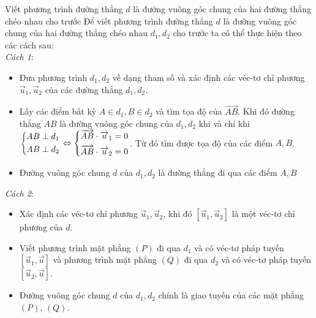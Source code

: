 \begin{dang}{Viết phương trình đường thẳng $d$ là đường vuông góc chung của hai đường thẳng chéo nhau cho trước}
Để viết phương trình đường thẳng $d$ là đường vuông góc chung của hai đường thẳng chéo nhau $d_1, d_2$ cho trước ta có thể thực hiện theo các cách sau:\\
\emph{Cách 1}:
\begin{itemize}
		\item Đưa phương trình $d_1, d_2$ về dạng tham số và xác định các véc-tơ chỉ phương $\overrightarrow{u}_1, \overrightarrow{u}_2$ của các đường thẳng $d_1, d_2$.
		\item Lấy các điểm bất kỳ $A\in d_1, B\in d_2$ và tìm tọa độ của $\overrightarrow{AB}$. Khi đó đường thẳng $AB$ là đường vuông góc chung của $d_1, d_2$ khi và chỉ khi $\left\{\begin{aligned}&AB\perp d_1\\&AB\perp d_2\end{aligned}\right.\Leftrightarrow \left\{\begin{aligned}&\overrightarrow{AB}\cdot\overrightarrow{u}_1=0\\&\overrightarrow{AB}\cdot\overrightarrow{u}_2=0\end{aligned}\right.$. Từ đó tìm được tọa độ của các điểm $A, B$.
        \item Đường vuông góc chung $d$ của $d_1, d_2$ là đường thẳng đi qua các điểm $A, B$
	\end{itemize}
\emph{Cách 2}:
		\begin{itemize}
		\item Xác định các véc-tơ chỉ phương $\overrightarrow{u}_1, \overrightarrow{u}_2$, khi đó $\left[\overrightarrow{u}_1, \overrightarrow{u}_2\right]$ là một véc-tơ chỉ phương của $d$.
        \item Viết phương trình mặt phẳng $(P)$ đi qua $d_1$ và có véc-tơ pháp tuyến $\left[\overrightarrow{u}_1, \overrightarrow{u}\right]$ và phương trình mặt phẳng $(Q)$ đi qua $d_2$ và có véc-tơ pháp tuyến $\left[\overrightarrow{u}_2, \overrightarrow{u}\right]$.
		\item Đường vuông góc chung $d$ của $d_1, d_2$ chính là giao tuyến của các mặt phẳng $(P)$, $(Q)$.
	\end{itemize}
\end{dang}
